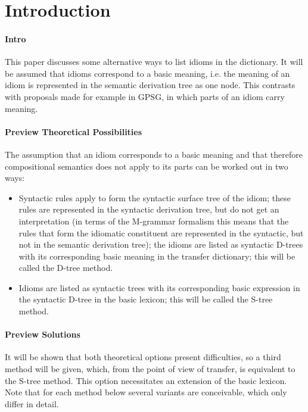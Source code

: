 

   \RosDate{\today}
   \RosSupersedes{-}
   \MakeRosTitle
%
%


\section{Introduction}

\paragraph{Intro}
This paper discusses some alternative ways to list idioms in the dictionary. 
It will be assumed that idioms correspond to a basic meaning, i.e. the meaning 
of an idiom is represented in the semantic derivation tree as one node. This 
contrasts with proposals made for example in GPSG, in which parts of an idiom 
carry meaning.

\paragraph{Preview Theoretical Possibilities}
The assumption that an idiom corresponds to a basic meaning and that therefore
compositional semantics does not apply to its parts can be worked out in two
ways: 

\begin{itemize}
  \item Syntactic rules apply to form the syntactic surface tree of the idiom;
these rules are represented in the syntactic derivation tree, but do not get an
interpretation (in terms of the M-grammar formalism this means that the rules
that form the idiomatic constituent are represented in the syntactic, but not
in the semantic derivation tree); the idioms are listed as syntactic D-trees 
with its corresponding basic meaning in the transfer dictionary; this will be
called the D-tree method. 
  \item Idioms are listed as syntactic trees with its corresponding basic 
expression in the syntactic D-tree in the basic lexicon; this will be called
the S-tree method. 
\end{itemize}

\paragraph{Preview Solutions}
It will be shown that both theoretical options present difficulties, so a
third method will be given, which, from the point of view of transfer, is 
equivalent to the S-tree method. This option necessitates an extension of the 
basic lexicon. Note that for each method below several variants are
conceivable, which only differ in detail. 

